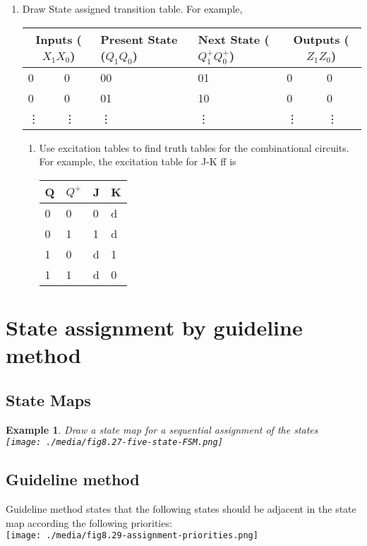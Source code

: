 \documentclass{article}
\newtheorem{example}{Example}
\begin{document}
\begin{enumerate}
   \item Draw State assigned transition table. For example,\\
     \begin{tabular}{llllll}
       \toprule
       \multicolumn{2}{c}{Inputs ($X_1 X_0$) } & Present State ($Q_1 Q_0$) & Next State ($Q_1^+Q_0^+$)& \multicolumn{2}{c}{Outputs ($Z_1 Z_0$)} \\
       \midrule
       0 & 0 & 00 & 01 & 0 & 0\\
       0 & 0 & 01 & 10 & 0 & 0\\
       \vdots & \vdots & \vdots & \vdots & \vdots & \vdots \\
       \bottomrule
     \end{tabular}
     \begin{enumerate}
       \item Use excitation tables to find truth tables for the combinational
         circuits. For example, the excitation table for J-K ff is\\
         \begin{tabular}{ll|ll}
           \toprule
           Q & $Q^{+}$ & J & K\\
           \midrule
           0 & 0 & 0 & d \\
           0 & 1 & 1 & d \\
           1 & 0 & d & 1 \\
           1 & 1 & d & 0 \\
           \bottomrule
         \end{tabular}
     \end{enumerate}
\end{enumerate}

\section{State assignment by guideline method ~\cite[Section~8.2.5]{katz2004contemporary}}
\subsection{State Maps}

\begin{example}
 Draw a state map for a sequential assignment  of the states\\
  \texttt{[image: ./media/fig8.27-five-state-FSM.png]}
\end{example}


\subsection{Guideline method}
Guideline method states that the following states should be adjacent in the
state map according the following priorities:\\
\texttt{[image: ./media/fig8.29-assignment-priorities.png]}
\end{document}
